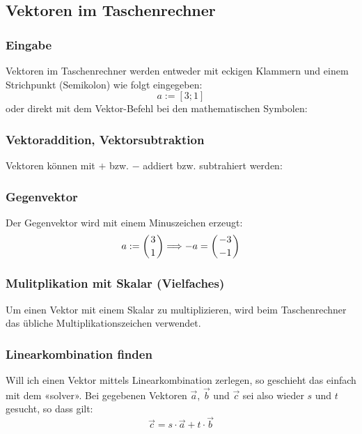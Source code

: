 \subsection{Vektoren im Taschenrechner}

\subsubsection{Eingabe}
Vektoren im Taschenrechner werden entweder mit eckigen Klammern und
einem Strichpunkt (Semikolon) wie folgt eingegeben:
$$a := [3; 1]$$
oder direkt mit dem Vektor-Befehl bei den mathematischen Symbolen:


\subsubsection{Vektoraddition, Vektorsubtraktion}
Vektoren können mit $+$ bzw. $-$ addiert bzw. subtrahiert
werden:

\subsubsection{Gegenvektor}
Der Gegenvektor wird mit einem Minuszeichen erzeugt:
$$a:=\left(3\atop 1\right) \Longrightarrow -a = \left( -3 \atop
-1\right)$$
\newpage

\subsubsection{Mulitplikation mit Skalar (Vielfaches)}

Um einen Vektor mit einem Skalar zu multiplizieren, wird beim
Taschenrechner das übliche Multiplikationszeichen verwendet.



\subsubsection{Linearkombination finden}
Will ich einen Vektor mittels Linearkombination
 zerlegen, so geschieht das einfach mit dem
«solver». Bei gegebenen Vektoren $\vec{a}$, $\vec{b}$ und $\vec{c}$ sei also
wieder $s$ und $t$ gesucht, so dass gilt:
$$\vec{c} = s\cdot{}\vec{a} + t\cdot{}\vec{b}$$

